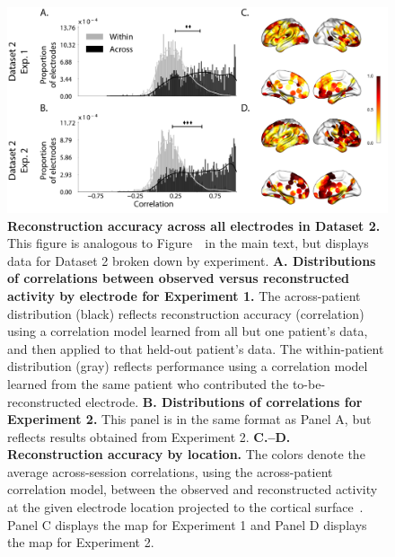 \documentclass[10pt]{article}
\begin{document}
\begin{figure}[p]
\centering \includegraphics[width=\textwidth]{figs/supplemental_3}
\caption{\textbf{Reconstruction accuracy across all electrodes in Dataset 2.}
This figure is analogous to Figure~\corrmaps~in the main text, but displays data
for Dataset 2 broken down by experiment. \textbf{A. Distributions of
correlations between observed versus reconstructed activity by electrode for
Experiment 1.}  The across-patient distribution (black) reflects reconstruction
accuracy (correlation) using a correlation model learned from all but one
patient's data, and then applied to that held-out patient's data.  The
within-patient distribution (gray) reflects performance using a correlation
model learned from the same patient who contributed the to-be-reconstructed
electrode. \textbf{B. Distributions of correlations for Experiment 2.}  This
panel is in the same format as Panel A, but reflects results obtained from
Experiment 2. \textbf{C.--D. Reconstruction accuracy by location.} The colors
denote the average across-session correlations, using the across-patient
correlation model, between the observed and reconstructed activity at the given
electrode location projected to the cortical surface~\citep{CombEtal19}.  Panel
C displays the map for Experiment 1 and Panel D displays the map for Experiment 2.}
\label{fig:supplemental_3}
\end{figure}
\end{document}
